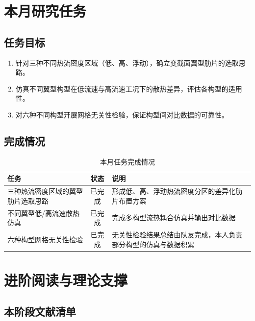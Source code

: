 \documentclass[stage2]{ydzjreport}
\begin{document}
\makestagetwohead

\section{本月研究任务}

\subsection{任务目标}

\begin{enumerate}
  \item 针对三种不同热流密度区域（低、高、浮动），确立变截面翼型肋片的选取思路。
  \item 仿真不同翼型构型在低流速与高流速工况下的散热差异，评估各构型的适用性。
  \item 对六种不同构型开展网格无关性检验，保证构型间对比数据的可靠性。
\end{enumerate}

\subsection{完成情况}

\begin{table}[htbp]
\centering
\caption{本月任务完成情况}
\begin{tabularx}{\textwidth}{@{}Y c Y@{}}
\toprule
{} 任务 & 状态 & 说明 \\
\midrule
三种热流密度区域的翼型肋片选取思路 & 已完成 & 形成低、高、浮动热流密度分区的差异化肋片布置方案 \\
不同翼型低/高流速散热仿真 & 已完成 & 完成多构型流热耦合仿真并输出对比数据 \\
六种构型网格无关性检验 & 已完成 & 无关性检验结果总结由队友完成，本人负责部分构型的仿真与数据积累 \\
\bottomrule
\end{tabularx}
\end{table}


\section{进阶阅读与理论支撑}

\subsection{本阶段文献清单}
\end{document}
